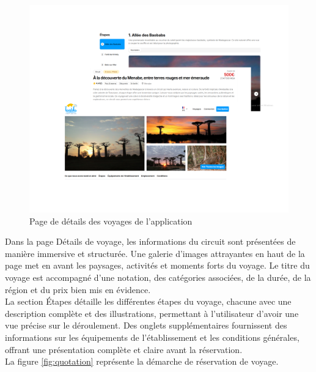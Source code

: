 \documentclass[12pt]{report}
\begin{document}
			\begin{figure}[h]
				\centering
				\includegraphics[width=\textwidth]{detailPage.png}
				\caption{Page de détails des voyages de l'application}
				\label{fig:detailPage}
			\end{figure}
			\FloatBarrier
	
			Dans la page Détails de voyage, les informations du circuit sont présentées de manière immersive et structurée. Une galerie d’images attrayantes en haut de la page met en avant les paysages, activités et moments forts du voyage. Le titre du voyage est accompagné d’une notation, des catégories associées, de la durée, de la région et du prix bien mis en évidence.\\

			La section Étapes détaille les différentes étapes du voyage, chacune avec une description complète et des illustrations, permettant à l’utilisateur d’avoir une vue précise sur le déroulement. Des onglets supplémentaires fournissent des informations sur les équipements de l’établissement et les conditions générales, offrant une présentation complète et claire avant la réservation.\\

			La figure \ref{fig:quotation} représente la démarche de réservation de voyage.
\end{document}
